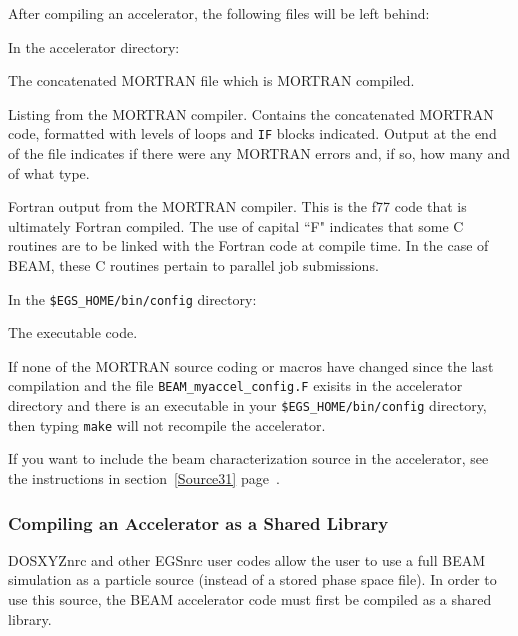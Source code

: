 \documentclass[12pt,twoside]{article}
\begin{document}
After compiling an accelerator, the following files will be left behind:
\begin{description}
\item In the accelerator directory:
\begin{description}
\item[{\tt mortjob.mortran}] The concatenated MORTRAN file which is MORTRAN
compiled.
\item[{\tt BEAM\_myaccel\_config.mortlst}] Listing from the MORTRAN compiler.
Contains the concatenated MORTRAN code, formatted with levels of
loops and {\tt IF} blocks indicated.  Output at the end of the file indicates
if there were any MORTRAN errors and, if so, how many and of what type.
\item[{\tt BEAM\_myaccel\_config.F}] Fortran output from the MORTRAN compiler.
This is the f77 code that is ultimately Fortran compiled.  The use of
capital ``F" indicates that some C routines are to be linked with the
Fortran code at compile time.  In the case of BEAM, these C routines pertain
to parallel job submissions.
\end{description}
\item In the {\tt \$EGS\_HOME/bin/config} directory:
\begin{description}
\item[{\tt BEAM\_myaccel*}] The executable code.
\end{description}
\end{description}

If none of the MORTRAN source coding or macros have changed since the last
compilation and the file {\tt BEAM\_myaccel\_config.F} exisits in the
accelerator directory and there is an executable in your
{\tt \$EGS\_HOME/bin/config} directory, then typing {\tt make} will not recompile
the accelerator.

If you want to include the beam characterization source in the accelerator,
see the instructions in section~\ref{Source31} page~\pageref{Source31}.

\subsubsection{Compiling an Accelerator as a Shared Library}
\label{sharedlibsect}

DOSXYZnrc\cite{Wa05} and other EGSnrc user codes\cite{Ro03} allow the user
to use a full BEAM simulation as a particle source (instead of a stored phase space
file).  In order to use this source, the BEAM accelerator code must first
be compiled as a shared library.
\end{document}
